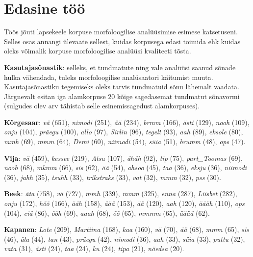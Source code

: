 \documentclass[12pt]{article}
\begin{document}
\newpage
\section{Edasine töö}

Töös jõuti lapsekeele korpuse morfoloogilise analüüsimise esimese katsetuseni. Selles osas annangi ülevaate sellest, kuidas korpusega edasi toimida ehk kuidas oleks võimalik korpuse morfoloogilise analüüsi kvaliteeti tõsta.

\textbf{Kasutajasõnastik}: selleks, et tundmatute ning vale analüüsi saanud sõnade hulka vähendada, tuleks morfoloogilise analüsaatori käitumist muuta. Kasutajasõnastiku tegemiseks oleks tarvis tundmatuid sõnu lähemalt vaadata. Järgnevalt esitan iga alamkorpuse 20 kõige sagedasemat tundmatut sõnavormi (sulgudes olev arv tähistab selle esinemissagedust alamkorpuses).

\textbf{Kõrgesaar}: \emph{vä} (651), \emph{nimodi} (251), \emph{ää} (234), \emph{brmm} (166), \emph{ästi} (129), \emph{nooh} (109), \emph{onju} (104), \emph{präegu} (100), \emph{allo} (97), \emph{Sirlin} (96), \emph{tegelt} (93), \emph{aah} (89), \emph{eksole} (80), \emph{mmh} (69), \emph{mmm} (64), \emph{Demi} (60), \emph{niimodi} (54), \emph{süia} (51), \emph{brumm} (48), \emph{ops} (47).

\textbf{Vija}: \emph{vä} (459), \emph{kessee} (219), \emph{Atsu} (107), \emph{ähäh} (92), \emph{tip} (75), \emph{part\_Toomas} (69), \emph{nooh} (68), \emph{mkmm} (66), \emph{sis} (62), \emph{ää} (54), \emph{ahsoo} (45), \emph{taa} (36), \emph{eksju} (36), \emph{niimodi} (36), \emph{jahh} (35), \emph{tsuhh} (33), \emph{trikstraks} (33), \emph{vat} (32), \emph{mmm} (32), \emph{pss} (30).

\textbf{Beek}: \emph{äta} (758), \emph{vä} (727), \emph{mmh} (339), \emph{mmm} (325), \emph{enna} (287), \emph{Liisbet} (282), \emph{onju} (172), \emph{hõõ} (166), \emph{ääh} (158), \emph{äää} (153), \emph{ää} (120), \emph{aah} (120), \emph{äääh} (110), \emph{ops} (104), \emph{eiä} (86), \emph{õõh} (69), \emph{aaah} (68), \emph{õõ} (65), \emph{mmmm} (65), \emph{ääää} (62).

\textbf{Kapanen}: \emph{Lote} (209), \emph{Martiina} (168), \emph{kaa} (160), \emph{vä} (70), \emph{ää} (68), \emph{mmm} (65), \emph{sis} (46), \emph{äla} (44), \emph{tan} (43), \emph{präegu} (42), \emph{nimodi} (36), \emph{aah} (33), \emph{süia} (33), \emph{puttu} (32), \emph{vata} (31), \emph{ästi} (24), \emph{taa} (24), \emph{ku} (24), \emph{tipa} (21), \emph{näedsa} (20).
\end{document}
